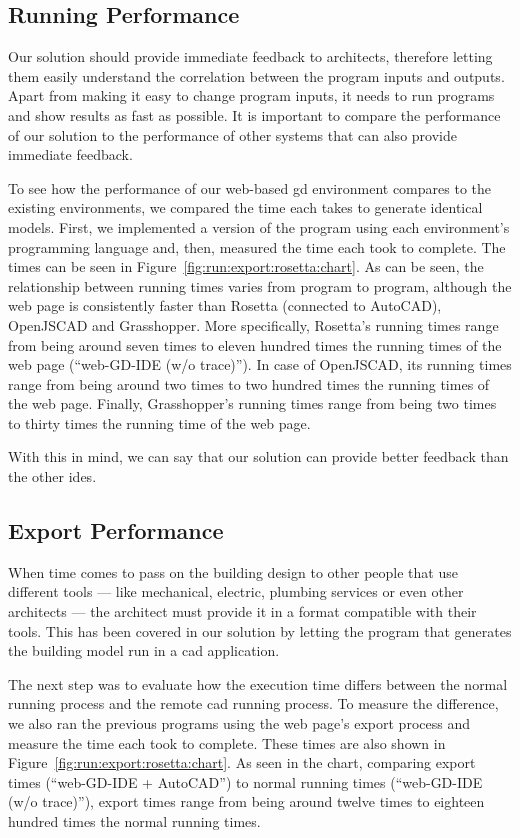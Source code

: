 \subsection{Running Performance}
Our solution should provide immediate feedback to architects, therefore letting them easily understand the correlation between the program inputs and outputs\cite{Leitao2014illustrated}.
Apart from making it easy to change program inputs, it needs to run programs and show results as fast as possible.
It is important to compare the performance of our solution to the performance of other systems that can also provide immediate feedback.

To see how the performance of our web-based \gls{gd} environment compares to the existing environments, we compared the time each takes to generate identical models.
First, we implemented a version of the program using each environment's programming language and, then, measured the time each took to complete.
The times can be seen in Figure~\ref{fig:run:export:rosetta:chart}.
As can be seen, the relationship between running times varies from program to program, although the web page is consistently faster than Rosetta (connected to AutoCAD), OpenJSCAD and Grasshopper.
More specifically, Rosetta's running times range from being around seven times to eleven hundred times the running times of the web page (``web-GD-IDE (w/o trace)'').
In case of OpenJSCAD, its running times range from being around two times to two hundred times the running times of the web page.
Finally, Grasshopper's running times range from being two times to thirty times the running time of the web page.

With this in mind, we can say that our solution can provide better feedback than the other \glspl{ide}.



\subsection{Export Performance}
When time comes to pass on the building design to other people that use different tools --- like mechanical, electric, plumbing services or even other architects --- the architect must provide it in a format compatible with their tools.
This has been covered in our solution by letting the program that generates the building model run in a \gls{cad} application.

The next step was to evaluate how the execution time differs between the normal running process and the remote \gls{cad} running process.
To measure the difference, we also ran the previous programs using the web page's export process and measure the time each took to complete.
These times are also shown in Figure~\ref{fig:run:export:rosetta:chart}.
As seen in the chart, comparing export times (``web-GD-IDE + AutoCAD'') to normal running times (``web-GD-IDE (w/o trace)''), export times range from being around twelve times to eighteen hundred times the normal running times.

